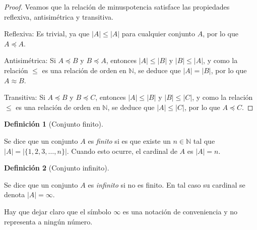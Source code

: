 \documentclass[
  a4paper,
]{scrreport}
\theoremstyle{plain}
\theoremstyle{plain}
\theoremstyle{definition}
\newtheorem{definition}{Definición}[chapter]
\theoremstyle{definition}
\theoremstyle{plain}
\theoremstyle{definition}
\theoremstyle{remark}
\begin{document}
\begin{tcolorbox}[enhanced jigsaw, rightrule=.15mm, toptitle=1mm, colbacktitle=quarto-callout-note-color!10!white, bottomrule=.15mm, opacityback=0, arc=.35mm, breakable, toprule=.15mm, left=2mm, coltitle=black, colback=white, opacitybacktitle=0.6, titlerule=0mm, colframe=quarto-callout-note-color-frame, bottomtitle=1mm, title=\textcolor{quarto-callout-note-color}{\faInfo}\hspace{0.5em}{Demostración}, leftrule=.75mm]

\begin{proof}

Veamos que la relación de minuspotencia satisface las propiedades
reflexiva, antisimétrica y transitiva.

Reflexiva: Es trivial, ya que \(|A|\leq |A|\) para cualquier conjunto
\(A\), por lo que \(A\preceq A\).

Antisimétrica: Si \(A\preceq B\) y \(B\preceq A\), entonces
\(|A|\leq |B|\) y \(|B|\leq |A|\), y como la relación \(\leq\) es una
relación de orden en \(\mathbb{N}\), se deduce que \(|A|=|B|\), por lo
que \(A\approx B\).

Transitiva: Si \(A\preceq B\) y \(B\preceq C\), entonces \(|A|\leq |B|\)
y \(|B|\leq |C|\), y como la relación \(\leq\) es una relación de orden
en \(\mathbb{N}\), se deduce que \(|A|\leq |C|\), por lo que
\(A\preceq C\).

\end{proof}

\end{tcolorbox}

\begin{definition}[Conjunto
finito]\protect\hypertarget{def-conjunto-finito}{}\label{def-conjunto-finito}

Se dice que un conjunto \(A\) es \emph{finito} si es que existe un
\(n\in\mathbb{N}\) tal que \(|A| = |\{1,2,3,\ldots,n \}|\). Cuando esto
ocurre, el cardinal de \(A\) es \(|A|=n\).

\end{definition}

\begin{definition}[Conjunto
infinito]\protect\hypertarget{def-conjunto-infinito}{}\label{def-conjunto-infinito}

Se dice que un conjunto \(A\) es \emph{infinito} si no es finito. En tal
caso su cardinal se denota \(|A|=\infty\).

\end{definition}

Hay que dejar claro que el símbolo \(\infty\) es una notación de
conveniencia y no representa a ningún número.
\end{document}

